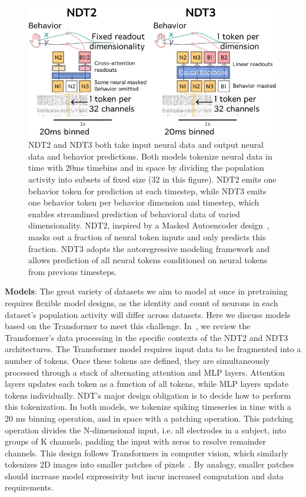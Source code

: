 \documentclass[12pt,oneside]{report}
\begin{document}
\begin{figure}[h]
  \centering
  \includegraphics[width=0.8\linewidth]{ch2_ndt_models.png}
  \caption{NDT2 and NDT3 both take input neural data and output neural data and behavior predictions. Both models tokenize neural data in time with 20ms timebins and in space by dividing the population activity into subsets of fixed size (32 in this figure). NDT2 emits one behavior token for prediction at each timestep, while NDT3 emits one behavior token per behavior dimension and timestep, which enables streamlined prediction of behavioral data of varied dimensionality. NDT2, inspired by a Masked Autoencoder design~\citep{he_21_mae}, masks out a fraction of neural token inputs and only predicts this fraction. NDT3 adopts the autoregressive modeling framework and allows prediction of all neural tokens conditioned on neural tokens from previous timesteps. }
  \label{fig:ndt_models}
\end{figure}

\textbf{Models}: The great variety of datasets we aim to model at once in pretraining requires flexible model designs, as the identity and count of neurons in each dataset’s population activity will differ across datasets. Here we discuss models based on the Transformer to meet this challenge. In~, we review the Transformer’s data processing in the specific contexts of the NDT2 and NDT3 architectures. The Transformer model requires input data to be fragmented into a number of tokens. Once these tokens are defined, they are simultaneously processed through a stack of alternating attention and MLP layers. Attention layers updates each token as a function of all tokens, while MLP layers update tokens individually. NDT’s major design obligation is to decide how to perform this tokenization. In both models, we tokenize spiking timeseries in time with a 20 ms binning operation, and in space with a patching operation. This patching operation divides the N-dimensional input, i.e. all electrodes in a subject, into groups of K channels, padding the input with zeros to resolve remainder channels. This design follows Transformers in computer vision, which similarly tokenizes 2D images into smaller patches of pixels~\citep{he_21_mae,dosovitskiy_2021_vit}. By analogy, smaller patches should increase model expressivity but incur increased computation and data requirements.
\end{document}
